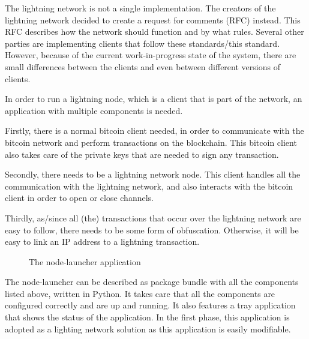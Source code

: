 The lightning network is not a single implementation. The creators of the lightning network decided to create a request for comments (RFC) instead. This RFC describes how the network should function and by what rules. Several other parties are implementing clients that follow these standards/this standard. However, because of the current work-in-progress state of the system, there are small differences between the clients and even between different versions of clients. 

In order to run a lightning node, which is a client that is part of the network, an application with multiple components is needed. 

Firstly, there is a normal bitcoin client needed, in order to communicate with the bitcoin network and perform transactions on the blockchain. This bitcoin client also takes care of the private keys that are needed to sign any transaction.

Secondly, there needs to be a lightning network node. This client handles all the communication with the lightning network, and also interacts with the bitcoin client in order to open or close channels. 

Thirdly, as/since all (the) transactions that occur over the lightning network are easy to follow, there needs to be some form of obfuscation. Otherwise, it will be easy to link an IP address to a lightning transaction.


\begin{figure}[h!]
  \setlength{\fboxsep}{0pt}%
  \center
  \caption{The node-launcher application}
\end{figure}

The node-launcher can be described as package bundle with all the components listed above, written in Python. It takes care that all the components are configured correctly and are up and running. It also features a tray application that shows the status of the application. In the first phase, this application is adopted as a lighting network solution as this application is easily modifiable.

